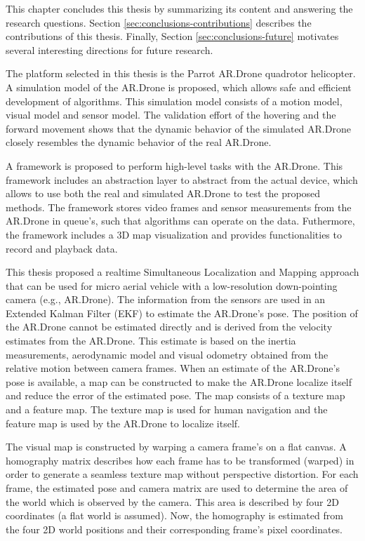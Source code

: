 This chapter concludes this thesis by summarizing its content and answering the research questions.
Section \ref{sec:conclusions-contributions} describes the contributions of this thesis.
Finally, Section \ref{sec:conclusions-future} motivates several interesting directions for future research.

The platform selected in this thesis is the Parrot AR.Drone quadrotor helicopter.
A simulation model of the AR.Drone is proposed, which allows safe and efficient development of algorithms.
This simulation model consists of a motion model, visual model and sensor model.
The validation effort of the hovering and the forward movement shows that the dynamic behavior of the simulated AR.Drone closely resembles the dynamic behavior of the real AR.Drone.

A framework is proposed to perform high-level tasks with the AR.Drone.
This framework includes an abstraction layer to abstract from the actual device, which allows to use both the real and simulated AR.Drone to test the proposed methods.
The framework stores video frames and sensor measurements from the AR.Drone in queue's, such that algorithms can operate on the data.
Futhermore, the framework includes a 3D map visualization and provides functionalities to record and playback data.

This thesis proposed a realtime Simultaneous Localization and Mapping approach that can be used for micro aerial vehicle with a low-resolution down-pointing camera (e.g., AR.Drone).
The information from the sensors are used in an Extended Kalman Filter (EKF) to estimate the AR.Drone's pose.
The position of the AR.Drone cannot be estimated directly and is derived from the velocity estimates from the AR.Drone.
This estimate is based on the inertia measurements, aerodynamic model and visual odometry obtained from the relative motion between camera frames.
When an estimate of the AR.Drone's pose is available, a map can be constructed to make the AR.Drone localize itself and reduce the error of the estimated pose.
The map consists of a texture map and a feature map.
The texture map is used for human navigation and the feature map is used by the AR.Drone to localize itself.

The visual map is constructed by warping a camera frame's on a flat canvas.
A homography matrix describes how each frame has to be transformed (warped) in order to generate a seamless texture map without perspective distortion.
For each frame, the estimated pose and camera matrix are used to determine the area of the world which is observed by the camera.
This area is described by four 2D coordinates (a flat world is assumed).
Now, the homography is estimated from the four 2D world positions and their corresponding frame's pixel coordinates.

